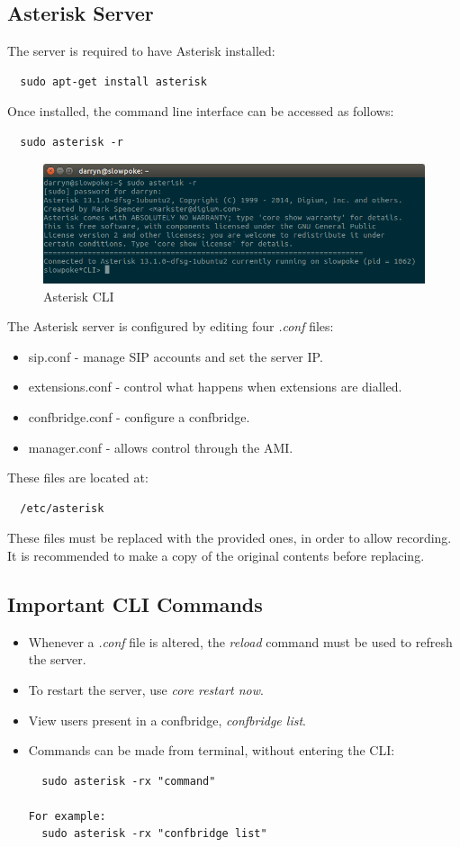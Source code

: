 \documentclass[a4paper,11pt]{report}
\begin{document}
\subsection{Asterisk Server}
The server is required to have Asterisk installed:
\begin{lstlisting}
  sudo apt-get install asterisk
\end{lstlisting}
Once installed, the command line interface can be accessed as follows:
\begin{lstlisting}
  sudo asterisk -r
\end{lstlisting}
\begin{figure}[h]
  \begin{center}
    \includegraphics[scale = 0.4]{asterisk_cli}
    \caption{Asterisk CLI}
  \end{center}
\end{figure}
The Asterisk server is configured by editing four \textit{.conf} files: 
\begin{itemize}
   \item sip.conf - manage SIP accounts and set the server IP.
   \item extensions.conf - control what happens when extensions are dialled.
   \item confbridge.conf - configure a confbridge.
   \item manager.conf - allows control through the AMI.
 \end{itemize} 
These files are located at:
\begin{lstlisting}
  /etc/asterisk
\end{lstlisting}
These files must be replaced with the provided ones, in order to allow recording. It is recommended to make a copy of the original contents before replacing.

\subsection{Important CLI Commands}
\begin{itemize}
  \item Whenever a \textit{.conf} file is altered, the \textit{reload} command must be used to refresh the server.
  \item To restart the server, use \textit{core restart now}.
  \item View users present in a confbridge, \textit{confbridge list}. 
  \item Commands can be made from terminal, without entering the CLI:
\begin{lstlisting}
  sudo asterisk -rx "command"
  
For example:
  sudo asterisk -rx "confbridge list"
\end{lstlisting} 
\end{itemize}
\end{document}
